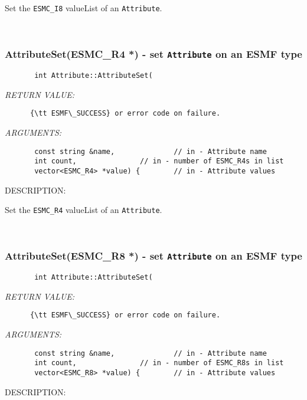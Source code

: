       Set the {\tt ESMC\_I8} valueList of an {\tt Attribute}.
   
 
\mbox{}\hrulefill\
 
\subsubsection [AttributeSet(ESMC\_R4] {AttributeSet(ESMC\_R4 *) - set {\tt Attribute} on an ESMF type}


  
\begin{verbatim}       int Attribute::AttributeSet(\end{verbatim}{\em RETURN VALUE:}
\begin{verbatim}      {\tt ESMF\_SUCCESS} or error code on failure.
   \end{verbatim}{\em ARGUMENTS:}
\begin{verbatim}       const string &name,              // in - Attribute name
       int count,               // in - number of ESMC_R4s in list
       vector<ESMC_R4> *value) {        // in - Attribute values
   \end{verbatim}
{\sf DESCRIPTION:\\ }


      Set the {\tt ESMC\_R4} valueList of an {\tt Attribute}.
   
 
\mbox{}\hrulefill\
 
\subsubsection [AttributeSet(ESMC\_R8] {AttributeSet(ESMC\_R8 *) - set {\tt Attribute} on an ESMF type}


  
\begin{verbatim}       int Attribute::AttributeSet(\end{verbatim}{\em RETURN VALUE:}
\begin{verbatim}      {\tt ESMF\_SUCCESS} or error code on failure.
   \end{verbatim}{\em ARGUMENTS:}
\begin{verbatim}       const string &name,              // in - Attribute name
       int count,               // in - number of ESMC_R8s in list
       vector<ESMC_R8> *value) {        // in - Attribute values
   \end{verbatim}
{\sf DESCRIPTION:\\ }


